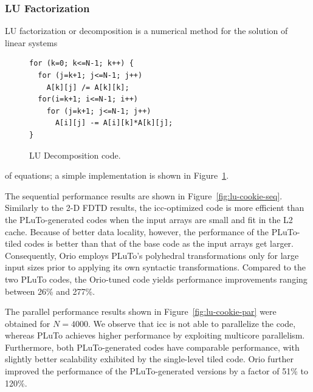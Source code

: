 \subsubsection{LU Factorization}  
 
LU factorization or decomposition is a numerical method for the solution of linear
systems 
%
\begin{figure}
\begin{center}
\vspace{-.2in}
\begin{minipage}{2.8in} 
\scriptsize
\begin{verbatim} 
for (k=0; k<=N-1; k++) { 
  for (j=k+1; j<=N-1; j++) 
    A[k][j] /= A[k][k]; 
  for(i=k+1; i<=N-1; i++) 
    for (j=k+1; j<=N-1; j++) 
      A[i][j] -= A[i][k]*A[k][j]; 
} 
\end{verbatim} 
\end{minipage} 
\end{center}
\vspace{-0.2in}
\caption{LU Decomposition code.} 
\label{fig:lu-code} 
\end{figure}
%
of equations; a simple implementation is shown in Figure~\ref{fig:lu-code}. 

The sequential performance results are shown in
Figure~\ref{fig:lu-cookie-seq}. Similarly to the 2-D FDTD results, the icc-optimized code is more
efficient than the PLuTo-generated codes when the input arrays are small and
fit in the L2 cache. Because of better data locality, however, the
performance of the PLuTo-tiled codes is better than that of the base code as
the input arrays get larger. 
Consequently, Orio employs PLuTo's polyhedral transformations only for large
input sizes prior to applying its own syntactic transformations. 
Compared to the two PLuTo codes, the
Orio-tuned code yields performance improvements ranging between 26\% and 277\%.

The parallel performance results shown in Figure~\ref{fig:lu-cookie-par} were
obtained for $N=4000$. We observe that icc is not able to parallelize the
code, whereas PLuTo achieves higher performance by exploiting multicore
parallelism. Furthermore, both PLuTo-generated codes have comparable
performance, with slightly better scalability exhibited by the single-level tiled
code. Orio further improved the performance of the PLuTo-generated versions
by a factor of 51\% to 120\%.
 
